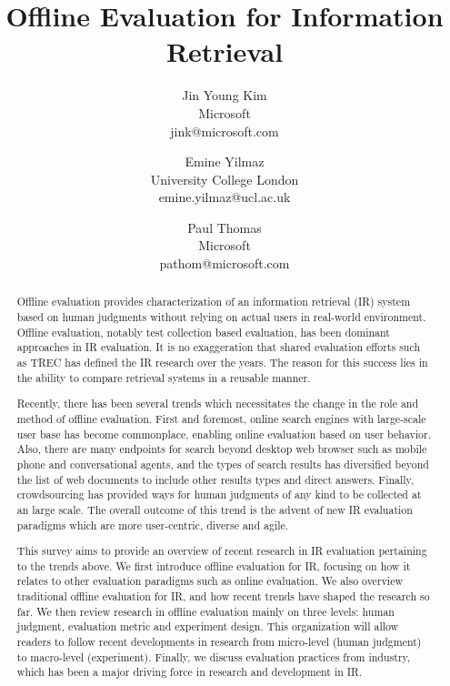 \documentclass[openany]{now} %
\title{Offline Evaluation for Information Retrieval}
\author{
	Jin Young Kim \\
	Microsoft \\
	jink@microsoft.com
	\and
	Emine Yilmaz \\
	University College London \\
	emine.yilmaz@ucl.ac.uk
	\and
	Paul Thomas \\
	Microsoft \\
	pathom@microsoft.com
}
\begin{document}

\frontmatter  %

\maketitle

\tableofcontents

\mainmatter

\begin{abstract}
Offline evaluation provides characterization of an information retrieval (IR) system based on human judgments without relying on actual users in real-world environment. Offline evaluation, notably test collection based evaluation, has been dominant approaches in IR evaluation. It is no exaggeration that shared evaluation efforts such as TREC has defined the IR research over the years. The reason for this success lies in the ability to compare retrieval systems in a reusable manner.

Recently, there has been several trends which necessitates the change in the role and method of offline evaluation. First and foremost, online search engines with large-scale user base has become commonplace, enabling online evaluation based on user behavior. Also, there are many endpoints for search beyond desktop web browser such as mobile phone and conversational agents, and the types of search results has diversified beyond the list of web documents to include other results types and direct answers. Finally, crowdsourcing has provided ways for human judgments of any kind to be collected at an large scale. The overall outcome of this trend is the advent of new IR evaluation paradigms which are more user-centric, diverse and agile.

This survey aims to provide an overview of recent research in IR evaluation pertaining to the trends above. We first introduce offline evaluation for IR, focusing on how it relates to other evaluation paradigms such as online evaluation. We also overview traditional offline evaluation for IR, and how recent trends have shaped the research so far. We then review research in offline evaluation mainly on three levels: human judgment, evaluation metric and experiment design. This organization will allow readers to follow recent developments in research from micro-level (human judgment) to macro-level (experiment). Finally, we discuss evaluation practices from industry, which has been a major driving force in research and development in IR.
	

\end{abstract}
\end{document}

